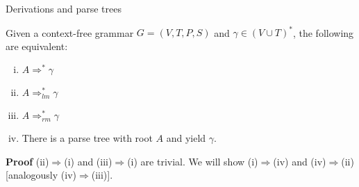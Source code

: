 \documentclass[handout]{beamer}
\begin{document}
\begin{frame}{Derivations and parse trees}

	\begin{theorem}
		Given a context-free grammar $G=(V,T,P,S)$ and $\gamma\in (V\cup T)^*$, the following are equivalent:
		\begin{enumerate}[(i)]
			\item $A\Rightarrow^* \gamma$
			\item $A\Rightarrow^*_{lm} \gamma$
			\item $A\Rightarrow^*_{rm} \gamma$
			\item There is a parse tree with root $A$ and yield $\gamma$.
		\end{enumerate}
	\end{theorem}

	\textbf{Proof} (ii)$\Rightarrow$(i) and (iii)$\Rightarrow$(i) are trivial. We will show (i)$\Rightarrow$(iv) and (iv)$\Rightarrow$(ii) [analogously (iv)$\Rightarrow$(iii)].
	
	\begin{center}
	\end{center}

\end{frame}
\end{document}
